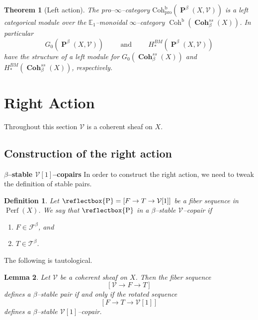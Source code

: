 \documentclass[11pt]{article}
\newtheorem{theorem}{Theorem}
\newtheorem{definition}{Definition}
\newtheorem{lemma}[theorem]{Lemma}
\newcommand{\pro}{\operatorname{Coh^b_{pro}}}
\newcommand{\fbeta}{\mathcal{F}^{\beta}}
\newcommand{\tbeta}{\mathcal{T}^{\beta}}
\newcommand{\coh}{\operatorname{Coh}}
\newcommand{\perf}{\operatorname{Perf}(X)}
\newcommand{\cohbetassstack}{\boldsymbol{\operatorname{Coh}}^{ss}_{\beta}(X)}
\newcommand{\framing}{\mathcal{V}}
\newcommand{\pairs}{\boldsymbol{\operatorname{P}}^{\beta}(X,\mathcal{V})}
\newcommand{\cop}{\reflectbox{\ensuremath{\operatorname{P}}}}
\begin{document}
 \begin{theorem}[Left action]\label{thm : left action}
      The pro--$\infty$--category $\pro(\pairs)$ is a left categorical module over the $\mathbb{E}_1$--monoidal $\infty$--category $\coh^{\operatorname{b}}(\cohbetassstack)$. In particular
       \[
            G_0(\pairs) \hspace{1cm} \text{and} \hspace{1cm} H_*^{BM}(\pairs)
       \]
       have the structure of a left module for $G_0(\cohbetassstack)$ and $H_*^{BM}(\cohbetassstack)$, respectively.
    \end{theorem}






\section{Right Action}
Throughout this section $\framing$ is a coherent sheaf on $X$.

\subsection{Construction of the right action}\label{subsec : construction of the right action}
\noindent\textbf{$\beta$--stable $\framing[1]$--copairs}
In order to construct the right action, we need to tweak the definition of stable pairs.
\begin{definition}\label{def : copairs}
     Let $\cop = [F \rightarrow T\rightarrow \framing[1]]$ be a fiber sequence in $\perf$. We say that $\cop$ in a $\beta$--stable $\framing$--copair if 
    \begin{enumerate}
        \item $F\in \fbeta$, and
        \item $T\in \tbeta$.
    \end{enumerate}
\end{definition}

\noindent The following is tautological.

\begin{lemma}\label{lemma : pair copair shift}
    Let $\framing$ be a coherent sheaf on $X$. Then the fiber sequence
    \[
        [\framing \rightarrow F \rightarrow T]
    \]
    defines a $\beta$--stable pair if and only if the rotated sequence
    \[
        [F \rightarrow T \rightarrow \framing[1]]
    \]
    defines a $\beta$--stable $\framing[1]$--copair.
\end{lemma}
\end{document}
